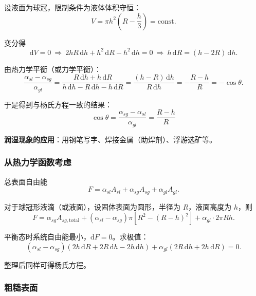 \documentclass[UTF8]{ctexart}
\theoremstyle{definition}
\begin{document}
设液面为球冠，限制条件为液体体积守恒：
\begin{equation}
V = \pi h^2\left(R-\frac{h}{3}\right) = \text{const}.
\end{equation}

变分得
\begin{equation}
\mathrm{d}V=0\ \Rightarrow\ 2hR\,\mathrm{d}h+h^2\,\mathrm{d}R-h^2\,\mathrm{d}h=0
\ \Rightarrow\ h\,\mathrm{d}R=(h-2R)\,\mathrm{d}h.
\end{equation}

由热力学平衡（或力学平衡）：
\begin{equation}
\frac{\alpha_{sl}-\alpha_{sg}}{\alpha_{gl}}
= \frac{R\,\mathrm{d}h+h\,\mathrm{d}R}{h\,\mathrm{d}h-R\,\mathrm{d}h-h\,\mathrm{d}R}
= \frac{(h-R)\,\mathrm{d}h}{R\,\mathrm{d}h}
= -\frac{R-h}{R}
= -\cos\theta.
\end{equation}

于是得到与杨氏方程一致的结果：
\begin{equation}
\boxed{\cos\theta = \frac{\alpha_{sg}-\alpha_{sl}}{\alpha_{gl}} = \frac{R-h}{R}}
\end{equation}

\textbf{润湿现象的应用}：用钢笔写字、焊接金属（助焊剂）、浮游选矿等。

\subsubsection*{从热力学函数考虑}

总表面自由能
\begin{equation}
F = \alpha_{sl}A_{sl} + \alpha_{sg}A_{sg} + \alpha_{gl}A_{gl}.
\end{equation}

对于球冠形液滴（或液面），设固体表面为圆形，半径为 $R$，液面高度为 $h$，则
\begin{equation}
F = \alpha_{sg}A_{sg,\text{total}} + (\alpha_{sl}-\alpha_{sg})\pi[R^2-(R-h)^2] + \alpha_{gl}\cdot 2\pi Rh.
\end{equation}

平衡态时系统自由能最小，$\mathrm{d}F=0$。求极值：
\begin{equation}
(\alpha_{sl}-\alpha_{sg})(2h\,\mathrm{d}R+2R\,\mathrm{d}h-2h\,\mathrm{d}h) + \alpha_{gl}(2R\,\mathrm{d}h+2h\,\mathrm{d}R)=0.
\end{equation}

整理后同样可得杨氏方程。

\subsubsection*{粗糙表面}
\end{document}
